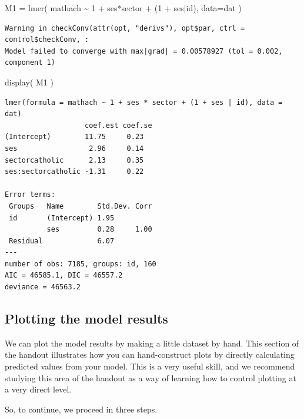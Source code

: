 \documentclass[
  letterpaper,
  DIV=11,
  numbers=noendperiod]{scrreprt}
\newenvironment{Shaded}{}{}
\newcommand{\AttributeTok}[1]{\textcolor[rgb]{0.49,0.56,0.16}{#1}}
\newcommand{\DecValTok}[1]{\textcolor[rgb]{0.25,0.63,0.44}{#1}}
\newcommand{\FunctionTok}[1]{\textcolor[rgb]{0.02,0.16,0.49}{#1}}
\newcommand{\NormalTok}[1]{#1}
\newcommand{\OtherTok}[1]{\textcolor[rgb]{0.00,0.44,0.13}{#1}}
\newcommand{\SpecialCharTok}[1]{\textcolor[rgb]{0.25,0.44,0.63}{#1}}
\begin{document}
\begin{Shaded}
\begin{Highlighting}[]
\NormalTok{M1 }\OtherTok{=} \FunctionTok{lmer}\NormalTok{( mathach }\SpecialCharTok{\textasciitilde{}} \DecValTok{1} \SpecialCharTok{+}\NormalTok{ ses}\SpecialCharTok{*}\NormalTok{sector }\SpecialCharTok{+}\NormalTok{ (}\DecValTok{1} \SpecialCharTok{+}\NormalTok{ ses}\SpecialCharTok{|}\NormalTok{id), }\AttributeTok{data=}\NormalTok{dat )}
\end{Highlighting}
\end{Shaded}

\begin{verbatim}
Warning in checkConv(attr(opt, "derivs"), opt$par, ctrl = control$checkConv, :
Model failed to converge with max|grad| = 0.00578927 (tol = 0.002, component 1)
\end{verbatim}

\begin{Shaded}
\begin{Highlighting}[]
\FunctionTok{display}\NormalTok{( M1 )}
\end{Highlighting}
\end{Shaded}

\begin{verbatim}
lmer(formula = mathach ~ 1 + ses * sector + (1 + ses | id), data = dat)
                   coef.est coef.se
(Intercept)        11.75     0.23  
ses                 2.96     0.14  
sectorcatholic      2.13     0.35  
ses:sectorcatholic -1.31     0.22  

Error terms:
 Groups   Name        Std.Dev. Corr 
 id       (Intercept) 1.95          
          ses         0.28     1.00 
 Residual             6.07          
---
number of obs: 7185, groups: id, 160
AIC = 46585.1, DIC = 46557.2
deviance = 46563.2 
\end{verbatim}

\subsection{Plotting the model
results}\label{plotting-the-model-results}

We can plot the model results by making a little dataset by hand. This
section of the handout illustrates how you can hand-construct plots by
directly calculating predicted values from your model. This is a very
useful skill, and we recommend studying this area of the handout as a
way of learning how to control plotting at a very direct level.

So, to continue, we proceed in three steps.
\end{document}
